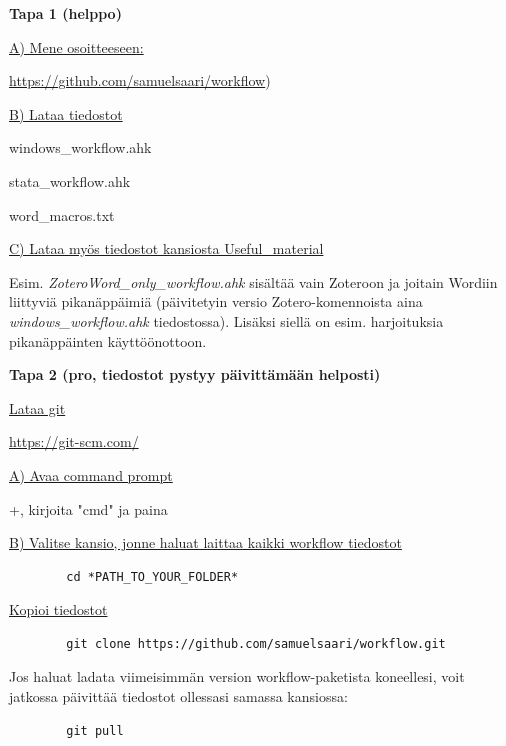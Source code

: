 \documentclass[a4paper,12pt]{scrartcl}
\begin{document}
\begin{framed}
	\textbf{Tapa 1 (helppo)}
	
	\underline{A) Mene osoitteeseen:}
	
	\url{https://github.com/samuelsaari/workflow})
	
	\medskip
	
	\underline{B) Lataa tiedostot}
	
	windows\_workflow.ahk
	
	stata\_workflow.ahk
	
	word\_macros.txt
	
	\medskip
	
	\underline{C) Lataa myös tiedostot kansiosta Useful\_material}
	
	Esim. \emph{ZoteroWord\_only\_workflow.ahk} sisältää vain Zoteroon ja joitain Wordiin liittyviä pikanäppäimiä (päivitetyin versio Zotero-komennoista aina \emph{windows\_workflow.ahk} tiedostossa). Lisäksi siellä on esim. harjoituksia pikanäppäinten käyttöönottoon. 
	
	\textbf{Tapa 2 (pro, tiedostot pystyy päivittämään helposti)}
	
	\underline{Lataa git}
	
	\url{https://git-scm.com/}
	
	\underline{A) Avaa command prompt}
	
	+, kirjoita "cmd" ja paina 
	
	\underline{B) Valitse kansio, jonne haluat laittaa kaikki workflow tiedostot}
	\begin{verbatim}
		cd *PATH_TO_YOUR_FOLDER*
	\end{verbatim}
	
	\underline{Kopioi tiedostot}
	\begin{verbatim}
		git clone https://github.com/samuelsaari/workflow.git
	\end{verbatim}
	

	Jos haluat ladata viimeisimmän version workflow-paketista koneellesi, voit jatkossa päivittää tiedostot ollessasi samassa kansiossa:
	\begin{verbatim}
		git pull
	\end{verbatim}

	\underline{}
	
	
\end{framed}
\end{document}
